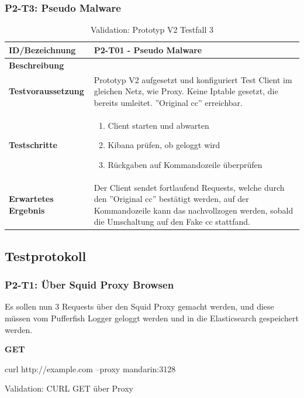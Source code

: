 \begin{table}[H]
\subsubsection{P2-T3: Pseudo Malware}
    \centering
	\begin{tabularx}{\textwidth}{| l | p{} |}
        \hline
        \textbf{ID/Bezeichnung} & P2-T01 - Pseudo Malware\\ \hline
        \textbf{Beschreibung} &  \\ \hline  
        \textbf{Testvoraussetzung} & Prototyp V2 aufgesetzt und konfiguriert Test Client im gleichen Netz, wie Proxy. Keine Iptable gesetzt, die bereits umleitet. ''Original \gls{cc}'' erreichbar. \\ \hline      
        \textbf{Testschritte} & \begin{enumerate}
        	\item Client starten und abwarten
        	\item Kibana prüfen, ob geloggt wird
        	\item Rückgaben auf Kommandozeile überprüfen
        \end{enumerate} \\ \hline    
        \textbf{Erwartetes Ergebnis} & Der Client sendet fortlaufend Requests, welche durch den ''Original \gls{cc}'' bestätigt werden, auf der Kommandozeile kann das nachvollzogen werden, sobald die Umschaltung auf den Fake \gls{cc} stattfand.\\ \hline      
    \end{tabularx}
    \caption{Validation: Prototyp V2 Testfall 3}
\end{table}


\subsection{Testprotokoll}
\subsubsection{P2-T1: Über Squid Proxy Browsen}
Es sollen nun 3 Requests über den Squid Proxy gemacht werden, und diese müssen vom Pufferfish Logger geloggt werden und in die Elasticsearch gespeichert werden.\\


\begin{listing}[H]
\textbf{GET}\\
\begin{fancycode}
curl http://example.com --proxy mandarin:3128
\end{fancycode}
\caption{Validation: CURL GET über Proxy}
\label{lst:curl-get-proxy}
\end{listing}


